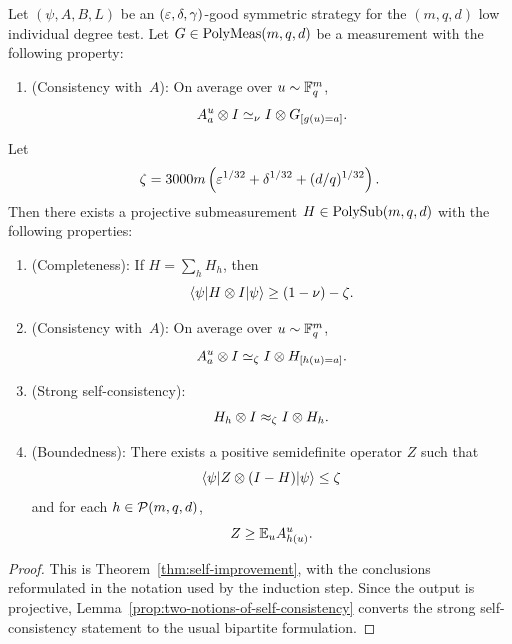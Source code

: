 \begin{theorem}\label{thm:self-improvement-in-induction-section}
  \leanok
  Let $(\psi,A,B,L)$ be an $(\varepsilon,\delta,\gamma)$-good symmetric strategy for the $(m,q,d)$ low individual degree test. Let $G \in \mathrm{PolyMeas}(m,q,d)$ be a measurement with the following property:
  \begin{enumerate}
    \item (Consistency with~$A$): \label{item:si-inductive-G-consistency} On average over $u \sim \mathbb{F}_q^m$,
    \[
      A_a^u \otimes I \simeq_\nu I \otimes G_{[g(u)=a]}.
    \]
  \end{enumerate}
  Let
  \[
    \zeta = 3000m\left(\varepsilon^{1/32}+\delta^{1/32}+(d/q)^{1/32}\right).
  \]
  Then there exists a projective submeasurement $H \in \mathrm{PolySub}(m,q,d)$ with the following properties:
  \begin{enumerate}
    \item (Completeness): \label{item:si-inductive-completeness} If $H=\sum_h H_h$, then
    \[
      \langle \psi \rvert H \otimes I \lvert \psi \rangle \ge (1-\nu)-\zeta.
    \]
    \item (Consistency with~$A$): \label{item:si-inductive-A-consistency} On average over $u \sim \mathbb{F}_q^m$,
    \[
      A_a^u \otimes I \simeq_\zeta I \otimes H_{[h(u)=a]}.
    \]
    \item (Strong self-consistency): \label{item:si-inductive-self}
    \[
      H_h \otimes I \approx_\zeta I \otimes H_h.
    \]
    \item (Boundedness): \label{item:si-inductive-boundedness} There exists a positive semidefinite operator $Z$ such that
    \[
      \langle \psi \rvert Z \otimes (I-H) \lvert \psi \rangle \le \zeta
    \]
    and for each $h \in \mathcal{P}(m,q,d)$,
    \[
      Z \ge \mathbb{E}_u A_{h(u)}^u.
    \]
  \end{enumerate}
\end{theorem}
\begin{proof}
	\leanok
	This is Theorem~\ref{thm:self-improvement}, with the conclusions reformulated in the notation used by the induction step. Since the output is projective, Lemma~\ref{prop:two-notions-of-self-consistency} converts the strong self-consistency statement to the usual bipartite formulation.
\end{proof}

